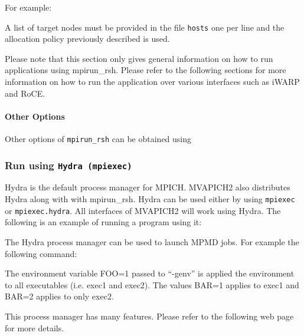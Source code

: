 For example:







A list of target nodes must be provided in the file \texttt{hosts}
one per line and the allocation policy previously described is used.

Please note that this section only gives general information on how to run
applications using mpirun\_rsh. Please refer to the following sections for
more information on how to run the application over various interfaces such as
iWARP and RoCE.

\paragraph{Other Options\\}
Other options of \texttt{mpirun\_rsh} can be obtained using



\subsubsection{Run using \texttt{Hydra (mpiexec)}}
\label{sec:run-hydra}

Hydra is the default process manager for MPICH. MVAPICH2 also
distributes Hydra along with with mpirun\_rsh. Hydra can be used either
by using \texttt{mpiexec} or \texttt{mpiexec.hydra}. All interfaces of
MVAPICH2 will work using Hydra.  The following is an example of running
a program using it:


The Hydra process manager can be used to launch MPMD jobs. For example
the following command:


The environment variable FOO=1 passed to ``-genv'' is applied the
environment to all executables (i.e. exec1 and exec2). The values BAR=1 applies
to exec1 and BAR=2 applies to only exec2.

This process manager has many features. Please refer to the following
web page for more details.

